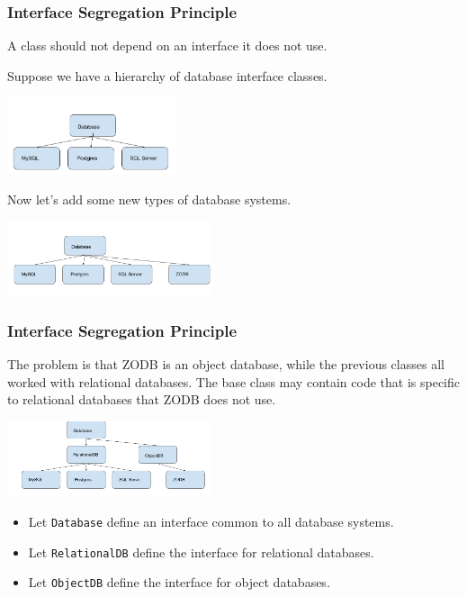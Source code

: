 \documentclass[10pt]{beamer}
\begin{document}
\begin{frame}
  \frametitle{Interface Segregation Principle}
  
  A class should not depend on an interface it does not use.
  
  \vspace{5mm}
  
  Suppose we have a hierarchy of database interface classes.
  
  \includegraphics[width=5cm]{db1.png}
  
  Now let's add some new types of database systems.
  
  \includegraphics[width=6cm]{db2.png}
\end{frame}  
 
\begin{frame}
  \frametitle{Interface Segregation Principle}
  
  The problem is that ZODB is an object database, while the previous
  classes all worked with relational databases. The base class may contain 
  code that is specific to relational databases that ZODB does not use.
  
  \vspace{5mm}
  
    
  \includegraphics[width=6cm]{db3.png}
  
  \begin{itemize}
    \item Let \texttt{Database} define an interface common to all database systems.
    \item Let \texttt{RelationalDB} define the interface for relational databases.
    \item Let \texttt{ObjectDB} define the interface for object databases.
  \end{itemize}
  
  
\end{frame} 
\end{document}
